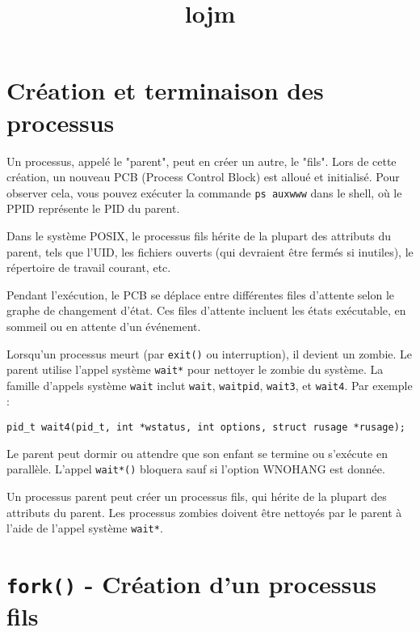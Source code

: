 \documentclass[12pt]{article}
\title{lojm}
\author{}
\date{}
\begin{document}
\maketitle
\tableofcontents
\newpage

\section{Création et terminaison des processus}

Un processus, appelé le "parent", peut en créer un autre, le "fils". Lors de cette création, un nouveau PCB (Process Control Block) est alloué et initialisé. Pour observer cela, vous pouvez exécuter la commande \texttt{ps auxwww} dans le shell, où le PPID représente le PID du parent.

Dans le système POSIX, le processus fils hérite de la plupart des attributs du parent, tels que l'UID, les fichiers ouverts (qui devraient être fermés si inutiles), le répertoire de travail courant, etc.

Pendant l'exécution, le PCB se déplace entre différentes files d'attente selon le graphe de changement d'état. Ces files d'attente incluent les états exécutable, en sommeil ou en attente d'un événement.

Lorsqu'un processus meurt (par \texttt{exit()} ou interruption), il devient un zombie. Le parent utilise l'appel système \texttt{wait*} pour nettoyer le zombie du système. La famille d'appels système \texttt{wait} inclut \texttt{wait}, \texttt{waitpid}, \texttt{wait3}, et \texttt{wait4}. Par exemple :

\begin{lstlisting}
pid_t wait4(pid_t, int *wstatus, int options, struct rusage *rusage);
\end{lstlisting}

Le parent peut dormir ou attendre que son enfant se termine ou s'exécute en parallèle. L'appel \texttt{wait*()} bloquera sauf si l'option WNOHANG est donnée.

\begin{tcolorbox}[title={À retenir}]
Un processus parent peut créer un processus fils, qui hérite de la plupart des attributs du parent. Les processus zombies doivent être nettoyés par le parent à l'aide de l'appel système \texttt{wait*}.
\end{tcolorbox}

\newpage

\section{\texttt{fork()} - Création d'un processus fils}
\end{document}
